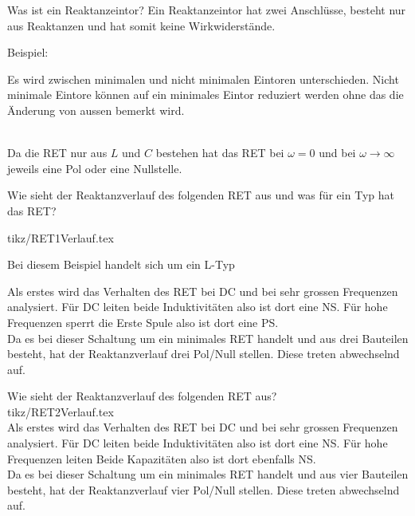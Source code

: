 
\begin{karte}{Was ist ein Reaktanzeintor?}
	Ein Reaktanzeintor hat zwei Anschlüsse, besteht nur aus Reaktanzen und hat somit keine Wirkwiderstände.
	\flushleft
	\begin{minipage}{0.32\textwidth}
		Beispiel:
		\scalebox{.8}{}
	\end{minipage}
	\begin{minipage}{0.65\textwidth}
		Es wird zwischen minimalen und nicht minimalen Eintoren unterschieden. Nicht minimale Eintore können auf ein minimales Eintor reduziert werden ohne das die Änderung von aussen bemerkt wird.
	\end{minipage}\\[5pt]
	Da die RET nur aus $L$ und $C$ bestehen hat das RET bei $\omega = 0$ und bei $\omega \rightarrow \infty$ jeweils eine Pol oder eine Nullstelle.
\end{karte}

\begin{karte}{Wie sieht der Reaktanzverlauf des folgenden RET aus und was für ein Typ hat das RET?\\[5pt]
	}
	\flushleft
	\begin{minipage}{0.55\textwidth}
		 {tikz/RET1Verlauf.tex}
	\end{minipage}
	\begin{minipage}{0.4\textwidth}
		Bei diesem Beispiel handelt sich um ein L-Typ
	\end{minipage}
	Als erstes wird das Verhalten des RET bei DC und bei sehr grossen Frequenzen analysiert. Für DC leiten beide Induktivitäten also ist dort eine NS. Für hohe Frequenzen sperrt die Erste Spule also ist dort eine PS.\\
	Da es bei dieser Schaltung um ein minimales RET handelt und aus drei Bauteilen besteht, hat der Reaktanzverlauf drei Pol/Null stellen. Diese treten abwechselnd auf.
\end{karte}

\begin{karte}{Wie sieht der Reaktanzverlauf des folgenden RET aus?\\[5pt]
		}
	\centering
	 {tikz/RET2Verlauf.tex}\\
	\flushleft
	\vspace{-5pt}
	Als erstes wird das Verhalten des RET bei DC und bei sehr grossen Frequenzen analysiert. Für DC leiten beide Induktivitäten also ist dort eine NS. Für hohe Frequenzen leiten Beide Kapazitäten also ist dort ebenfalls NS.\\
	Da es bei dieser Schaltung um ein minimales RET handelt und aus vier Bauteilen besteht, hat der Reaktanzverlauf vier Pol/Null stellen. Diese treten abwechselnd auf.
\end{karte}

